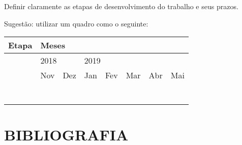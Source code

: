\documentclass[prop-esp]{iiufrgs}
\begin{document}
\noindent Definir claramente as etapas de desenvolvimento do trabalho e seus prazos.

\noindent 

\noindent Sugest\~{a}o: utilizar um quadro como o seguinte:

\noindent 

\begin{tabular}{|p{1.8in}|p{0.3in}|p{0.3in}|p{0.3in}|p{0.3in}|p{0.3in}|p{0.3in}|p{0.3in}|} \hline 
Etapa & \multicolumn{7}{|p{2.0in}|}{Meses} \\ \hline 
 & \multicolumn{2}{|p{0.6in}|}{2018} & \multicolumn{5}{|p{1.4in}|}{2019} \\ \hline 
 & Nov & Dez & Jan & Fev & Mar & Abr & Mai \\ \hline 
 &  &  &  &  &  &  &  \\ \hline 
 &  &  &  &  &  &  &  \\ \hline 
 &  &  &  &  &  &  &  \\ \hline 
 &  &  &  &  &  &  &  \\ \hline 
 &  &  &  &  &  &  &  \\ \hline 
 &  &  &  &  &  &  &  \\ \hline 
 &  &  &  &  &  &  &  \\ \hline 
\end{tabular}



%
\chapter{BIBLIOGRAFIA}



\end{document}
